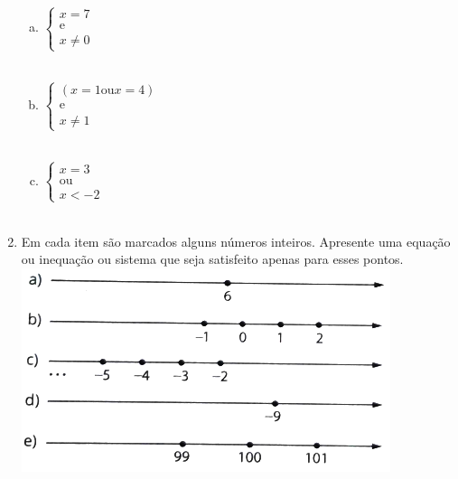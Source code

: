 \documentclass[a4paper,14pt]{article}
\begin{document}
\begin{multicols}{2}
\begin{enumerate}
\begin{enumerate}[a)]
				\item $
				\begin{cases}
					x = 7 \\
					\text{e} \\
					x \neq 0
				\end{cases}$ \\\\
				\item $
				\begin{cases}
					(x = 1 \text{ou} x = 4) \\
					\text{e} \\
					x \neq 1
				\end{cases}$ \\\\
				\item $
				\begin{cases}
					x = 3 \\
					\text{ou} \\
					x < -2
				\end{cases}$ \\\\
			\end{enumerate}
			\item Em cada item são marcados alguns números inteiros. Apresente uma equação ou inequação ou sistema que seja satisfeito apenas para esses pontos.
			\includegraphics[width=1\linewidth]{imagens_6FMA34/imagem1}
			
    	\end{enumerate}
    $~$ \\ $~$ \\ $~$ \\ $~$ \\ $~$ \\ $~$ 
    \end{multicols}
\end{document}
